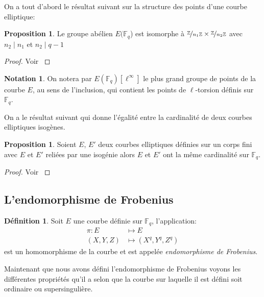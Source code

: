 \documentclass[10pt,a4paper]{book}
\theoremstyle{plain}
\theoremstyle{definition}
\theoremstyle{definition}
\theoremstyle{definition}
\newtheorem{prop}[thm]{Proposition}
\theoremstyle{definition}
\newtheorem{defi}[thm]{Définition}
\theoremstyle{remark}
\theoremstyle{remark}
\theoremstyle{definition}
\newtheorem{nota}[thm]{Notation}
\begin{document}
On a tout d'abord le résultat suivant sur la structure des points d'une courbe elliptique:
\begin{prop}
Le groupe abélien $E(\mathbb{F}_q$) est isomorphe à $\nicefrac{\mathbb{Z}}{n_1 \mathbb{Z}} \times \nicefrac{\mathbb{Z}}{n_2 \mathbb{Z}}$ avec $n_2 \mid n_1$ et $n_2 \mid q-1$
\end{prop}

\begin{proof}
Voir \cite[Theorem 4.1]{Washington2008}
\end{proof}

\begin{nota}
On notera par $E(\mathbb{F}_q)[\ell^{\infty}]$ le plus grand groupe de points 
de la courbe $E$, au sens de l'inclusion, qui contient les points de 
$\ell$-torsion définis sur $\mathbb{F}_q$.
\end{nota}

On a le résultat suivant qui donne l'égalité entre la cardinalité de deux courbes elliptiques isogènes.

\begin{prop}
\label{pro:iso:ega}
Soient $E$, $E'$ deux courbes elliptiques définies sur un corps fini avec $E$ et $E'$ reliées par une isogénie alors $E$ et $E'$ ont la même cardinalité sur $\mathbb{F}_q$.
\end{prop}

\begin{proof}
Voir \cite[Exercise V.5.4.a]{Silv1}
\end{proof}

\subsection{L'endomorphisme de Frobenius}
\begin{defi}
Soit $E$ une courbe définie sur $\mathbb{F}_q$, l'application: 
\begin{equation*}
\begin{alignedat}{1}
\pi :E &\mapsto  E  \\
 (X,Y,Z)  &\mapsto (X^q,Y^q,Z^q)  
\end{alignedat}
\end{equation*}
est un homomorphisme de la courbe et est appelée \emph{endomorphisme de Frobenius}. 
\end{defi}

Maintenant que nous avons défini l'endomorphisme de Frobenius voyons les 
différentes propriétés qu'il a selon que la courbe sur laquelle il est défini 
soit ordinaire ou supersingulière.
\end{document}
